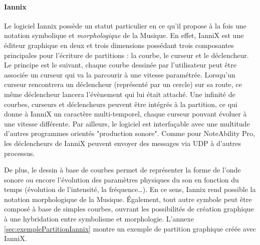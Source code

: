 \paragraph{Iannix} Le logiciel Iannix possède un statut particulier en ce qu'il propose à la fois une notation symbolique et \textit{morphologique} de la Musique. En effet, IanniX est une éditeur graphique en deux et trois dimensions possédant trois composantes principales pour l'écriture de partitions : la courbe, le curseur et le déclencheur. Le principe est le suivant, chaque courbe dessinée par l'utilisateur peut être associée un curseur qui va la parcourir à une vitesse paramétrée. Lorsqu'un curseur rencontrera un déclencheur (représenté par un cercle) sur sa route, ce même déclencheur lancera l'évènement qui lui était attaché.
Une infinité de courbes, curseurs et déclencheurs peuvent être intégrés à la partition, ce qui donne à IanniX un caractère multi-temporel, chaque curseur pouvant évoluer à une vitesse différente.
Par ailleurs, le logiciel est interfaçable avec une multitude d'autres programmes orientés "production sonore". Comme pour NoteAbility Pro, les déclencheurs de IanniX peuvent envoyer des messages via UDP à d'autres processus.

De plus, le dessin à base de courbes permet de représenter la forme de l'onde sonore ou encore l'évolution  des paramètres physiques du son en fonction du temps (évolution de l'intensité, la fréquence…). En ce sens, Iannix rend possible la notation morphologique de la Musique.
Également, tout autre symbole peut être composé à base de simples courbes, ouvrant les possibilités de création graphique à une hybridation entre symbolisme et morphologie.
L'annexe \ref{sec:exemplePartitionIannix} montre un exemple de partition graphique créée avec IanniX.


